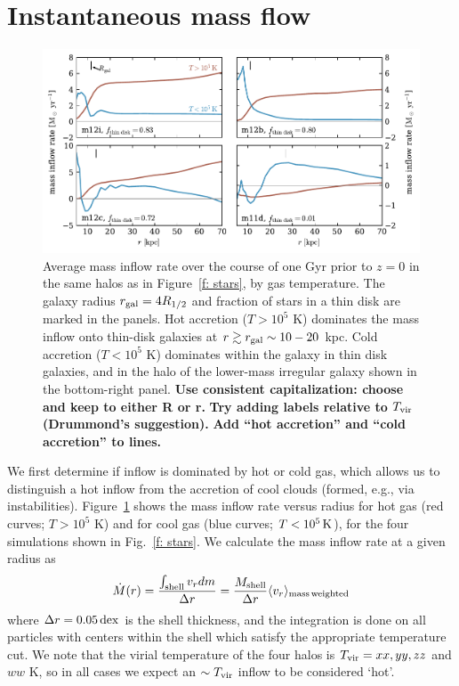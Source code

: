 \documentclass[fleqn,usenatbib]{mnras}
\newcommand{\Mdot}{\dot{M}}
\newcommand{\Tvir}{T_{\rm vir}}
\begin{document}
\section{Instantaneous mass flow}
\label{s: appendix-mass flow}

\begin{figure}
    \centering
    \includegraphics{figures/Mdot.pdf}
    \caption{
    Average mass inflow rate over the course of one Gyr prior to $z=0$ in the same halos as in Figure~\ref{f: stars}, by gas temperature.
    The galaxy radius $r_{\rm gal}=4 R_{1/2}$ and fraction of stars in a thin disk are marked in the panels. 
    Hot accretion ($T>10^5$ K) dominates the mass inflow onto thin-disk galaxies at $r \gtrsim r_{\rm gal} \sim 10-20$ kpc.
    Cold accretion ($T<10^5$ K) dominates within the galaxy in thin disk galaxies, and in the halo of the lower-mass irregular galaxy shown in the bottom-right panel.
    \textbf{Use consistent capitalization: choose and keep to either R or r.}
    \textbf{Try adding labels relative to $T_{\rm vir}$ (Drummond's suggestion).}
    \textbf{Add ``hot accretion'' and ``cold accretion'' to lines.}
    }
    \label{f: Mdot}
\end{figure}

We first determine if inflow is dominated by hot or cold gas, which allows us to distinguish a hot inflow from the accretion of cool clouds (formed, e.g., via instabilities).
Figure~\ref{f: Mdot} shows the mass inflow rate versus radius for hot gas (red curves; $T>10^5$ K) and for cool gas (blue curves; $T < 10^5\,{\rm K}$),  for the four simulations shown in Fig.~\ref{f: stars}. 
We calculate the mass inflow rate at a given radius as
\begin{equation}
     \Mdot(r) = \frac{\int_{\rm shell} v_r dm}{\Delta r} = \frac{M_{\rm shell}}{\Delta r} \langle v_r\rangle_{\rm mass\, weighted}
     \label{e: Mdot}
\end{equation}
where $\Delta r=0.05\,{\rm dex}$ is the shell thickness, and the integration is done on all particles with centers within the shell which satisfy the appropriate temperature cut. 
We note that the virial temperature of the four halos is $\Tvir = xx, yy, zz$ and $ww$ K, so in all cases we expect an $\sim\Tvir$ inflow  to be considered `hot'. 
\end{document}

